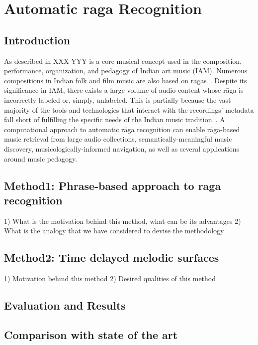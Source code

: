 
\chapter{Automatic \Gls{raga} Recognition}

\section{Introduction}


As described in XXX YYY is a core musical concept used in the composition, performance, organization, and pedagogy of Indian art music (IAM). Numerous compositions in Indian folk and film music are also based on r\={a}gas~\citep{ganti2013bollywood}. Despite its significance in IAM, there exists a large volume of audio content whose r\={a}ga is incorrectly labeled or, simply, unlabeled. This is partially because the vast majority of the tools and technologies that interact with the recordings' metadata fall short of fulfilling the specific needs of the Indian music tradition~\cite{XavierSerra2011}. A computational approach to automatic r\={a}ga recognition can enable r\={a}ga-based music retrieval from large audio collections, semantically-meaningful music discovery, musicologically-informed navigation, as well as several applications around music pedagogy. 
%
%
%
%
%
\section{Method1: Phrase-based approach to raga recognition}

1) What is the motivation behind this method, what can be its advantages
2) What is the analogy that we have considered to devise the methodology


\section{Method2: Time delayed melodic surfaces}

1) Motivation behind this method
2) Desired qualities of this method

\section{Evaluation and Results}
\section{Comparison with state of the art}



